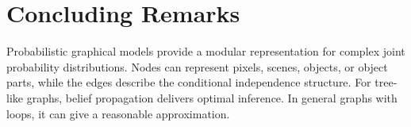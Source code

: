 \section{Concluding Remarks}

Probabilistic graphical models provide a modular representation for complex joint probability distributions. Nodes can represent pixels, scenes, objects, or object parts, while the edges describe the conditional independence structure. For tree-like graphs, belief propagation delivers optimal inference. In general graphs with loops, it can give a reasonable approximation.
